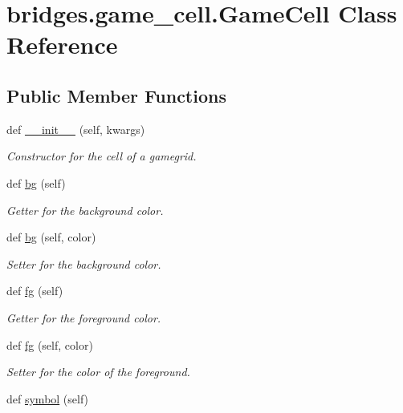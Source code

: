 \hypertarget{classbridges_1_1game__cell_1_1_game_cell}{}\section{bridges.\+game\+\_\+cell.\+Game\+Cell Class Reference}
\label{classbridges_1_1game__cell_1_1_game_cell}
\subsection*{Public Member Functions}
\begin{DoxyCompactItemize}
\item 
def \hyperlink{classbridges_1_1game__cell_1_1_game_cell_a5f604c05c0d42179a09ace913302d57b}{\+\_\+\+\_\+init\+\_\+\+\_\+} (self, kwargs)
\begin{DoxyCompactList}\small\item\em Constructor for the cell of a gamegrid. \end{DoxyCompactList}\item 
def \hyperlink{classbridges_1_1game__cell_1_1_game_cell_a64581c2fd4a7c1da8e302ba9f843aae4}{bg} (self)
\begin{DoxyCompactList}\small\item\em Getter for the background color. \end{DoxyCompactList}\item 
def \hyperlink{classbridges_1_1game__cell_1_1_game_cell_ac500927058f98ad319821d5c89c91246}{bg} (self, color)
\begin{DoxyCompactList}\small\item\em Setter for the background color. \end{DoxyCompactList}\item 
def \hyperlink{classbridges_1_1game__cell_1_1_game_cell_a351a23a7e0c4a8b026ab95bff6c05e35}{fg} (self)
\begin{DoxyCompactList}\small\item\em Getter for the foreground color. \end{DoxyCompactList}\item 
def \hyperlink{classbridges_1_1game__cell_1_1_game_cell_ae49f154ef62b58e70c06b6a1da230acc}{fg} (self, color)
\begin{DoxyCompactList}\small\item\em Setter for the color of the foreground. \end{DoxyCompactList}\item 
def \hyperlink{classbridges_1_1game__cell_1_1_game_cell_adc1c02a52845c2673d43167212574904}{symbol} (self)

\end{DoxyCompactItemize}
